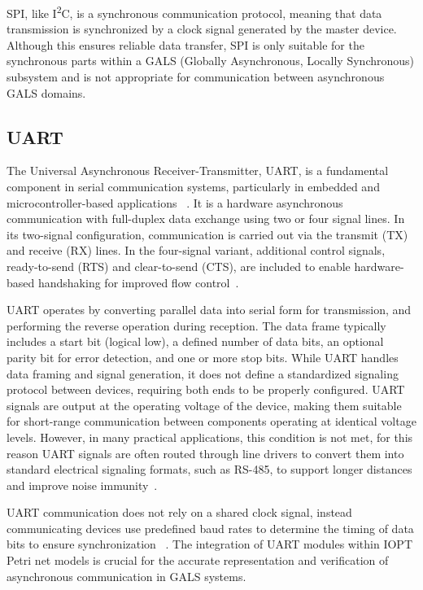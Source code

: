 SPI, like I\textsuperscript{2}C, is a synchronous communication protocol, meaning that data transmission is synchronized by a clock signal generated by the master device. Although this ensures reliable data transfer, SPI is only suitable for the synchronous parts within a GALS (Globally Asynchronous, Locally Synchronous) subsystem and is not appropriate for communication between asynchronous GALS domains.

\subsection{UART}
\label{sub:uart}

The Universal Asynchronous Receiver-Transmitter, UART, is a fundamental component in serial communication systems, particularly in embedded and microcontroller-based applications ~\cite{UARTwiki}. It is a hardware asynchronous communication with full-duplex data exchange using two or four signal lines. In its two-signal configuration, communication is carried out via the transmit (TX) and receive (RX) lines. In the four-signal variant, additional control signals, ready-to-send (RTS) and clear-to-send (CTS), are included to enable hardware-based handshaking for improved flow control~\cite{Rao2021}.

UART operates by converting parallel data into serial form for transmission, and performing the reverse operation during reception. The data frame typically includes a start bit (logical low), a defined number of data bits, an optional parity bit for error detection, and one or more stop bits. While UART handles data framing and signal generation, it does not define a standardized signaling protocol between devices, requiring both ends to be properly configured. UART signals are output at the operating voltage of the device, making them suitable for short-range communication between components operating at identical voltage levels. However, in many practical applications, this condition is not met, for this reason  UART signals are often routed through line drivers to convert them into standard electrical signaling formats, such as RS-485, to support longer distances and improve noise immunity~\cite{Rao2021}.

UART communication does not rely on a shared clock signal, instead communicating devices use predefined baud rates to determine the timing of data bits to ensure synchronization ~\cite{UARTard}.  The integration of UART modules within IOPT Petri net models is crucial for the accurate representation and verification of asynchronous communication in GALS systems. 




